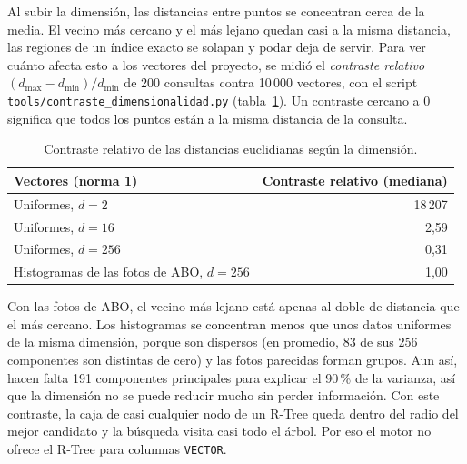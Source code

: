 \documentclass[11pt,a4paper]{article}
\begin{document}
Al subir la dimensión, las distancias entre puntos se concentran cerca de la media. El vecino más cercano y el más lejano quedan casi a la misma distancia, las regiones de un índice exacto se solapan y podar deja de servir. Para ver cuánto afecta esto a los vectores del proyecto, se midió el \emph{contraste relativo} $(d_{\max} - d_{\min}) / d_{\min}$ de 200 consultas contra 10\,000 vectores, con el script \texttt{tools/contraste\_dimensionalidad.py} (tabla~\ref{tab:contraste}). Un contraste cercano a 0 significa que todos los puntos están a la misma distancia de la consulta.

\begin{table}[H]
\centering
\begin{tabular}{lr}
\toprule
Vectores (norma 1) & Contraste relativo (mediana) \\
\midrule
Uniformes, $d = 2$ & 18\,207 \\
Uniformes, $d = 16$ & 2,59 \\
Uniformes, $d = 256$ & 0,31 \\
Histogramas de las fotos de ABO, $d = 256$ & 1,00 \\
\bottomrule
\end{tabular}
\caption{Contraste relativo de las distancias euclidianas según la dimensión.}
\label{tab:contraste}
\end{table}

Con las fotos de ABO, el vecino más lejano está apenas al doble de distancia que el más cercano. Los histogramas se concentran menos que unos datos uniformes de la misma dimensión, porque son dispersos (en promedio, 83 de sus 256 componentes son distintas de cero) y las fotos parecidas forman grupos. Aun así, hacen falta 191 componentes principales para explicar el 90\,\% de la varianza, así que la dimensión no se puede reducir mucho sin perder información. Con este contraste, la caja de casi cualquier nodo de un R-Tree queda dentro del radio del mejor candidato y la búsqueda visita casi todo el árbol. Por eso el motor no ofrece el R-Tree para columnas \texttt{VECTOR}.
\end{document}
